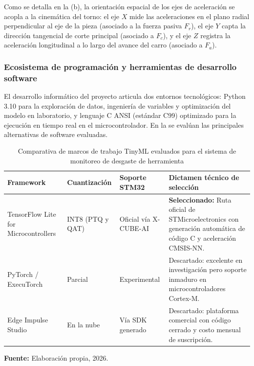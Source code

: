 Como se detalla en la (b), la orientación espacial de los ejes de aceleración se acopla a la cinemática del torno: el eje $X$ mide las aceleraciones en el plano radial perpendicular al eje de la pieza (asociado a la fuerza pasiva $F_r$), el eje $Y$ capta la dirección tangencial de corte principal (asociado a $F_c$), y el eje $Z$ registra la aceleración longitudinal a lo largo del avance del carro (asociado a $F_a$).

\subsubsection{Ecosistema de programación y herramientas de desarrollo software}

El desarrollo informático del proyecto articula dos entornos tecnológicos: Python 3.10 para la exploración de datos, ingeniería de variables y optimización del modelo en laboratorio, y lenguaje C ANSI (estándar C99) optimizado para la ejecución en tiempo real en el microcontrolador. En la  se evalúan las principales alternativas de software evaluadas.

\begin{table}[H]
\centering
\caption{Comparativa de marcos de trabajo TinyML evaluados para el sistema de monitoreo de desgaste de herramienta}\label{tab:comparativa_tinyml_frameworks}
\vspace{2mm}
\small
\begin{tabular}{|p{3.2cm}|p{2.3cm}|p{2.3cm}|p{5.4cm}|}
\hline
\textbf{Framework} & \textbf{Cuantización} & \textbf{Soporte STM32} & \textbf{Dictamen técnico de selección} \\ \hline \hline
TensorFlow Lite for Microcontrollers & INT8 (PTQ y QAT) & Oficial vía X-CUBE-AI & \textbf{Seleccionado:} Ruta oficial de STMicroelectronics con generación automática de código C y aceleración CMSIS-NN. \\ \hline
PyTorch / ExecuTorch & Parcial & Experimental & Descartado: excelente en investigación pero soporte inmaduro en microcontroladores Cortex-M. \\ \hline
Edge Impulse Studio & En la nube & Vía SDK generado & Descartado: plataforma comercial con código cerrado y costo mensual de suscripción. \\ \hline
\end{tabular}
\par\vspace{2mm}
\footnotesize \textbf{Fuente:} Elaboración propia, 2026.
\end{table}

